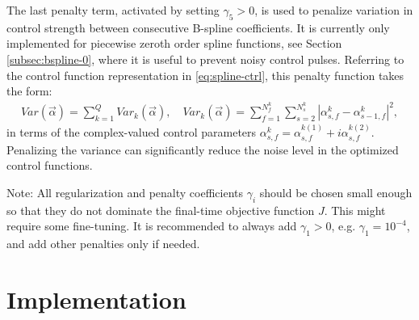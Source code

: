 \documentclass[11pt]{article}
\begin{document}
The last penalty term, activated by setting $\gamma_5>0$, is used to penalize variation in control strength between consecutive B-spline coefficients. It is currently only implemented for piecewise zeroth order spline functions, see Section \ref{subsec:bspline-0}, where it is useful to prevent noisy control pulses. Referring to the control function representation in \eqref{eq:spline-ctrl}, this penalty function takes the form:
\begin{align}
  Var(\vec{\alpha}) = \sum_{k=1}^Q Var_k(\vec{\alpha}),\quad Var_k(\vec{\alpha}) = \sum_{f=1}^{N_f^k} \sum_{s=2}^{N_s^k} |\alpha_{s,f}^k - \alpha_{s-1,f}^k|^2,
\end{align}
in terms of the complex-valued control parameters $\alpha_{s,f}^k = \alpha_{s,f}^{k(1)} + i \alpha_{s,f}^{k(2)}$. Penalizing the variance can significantly reduce the noise level in the optimized control functions.

Note: All regularization and penalty coefficients $\gamma_i$ should be chosen small enough so that they do not dominate the final-time objective function $J$. This might require some fine-tuning. It is recommended to always add $\gamma_1>0$, e.g. $\gamma_1 = 10^{-4}$, and add other penalties only if needed. 



\section{Implementation}
\end{document}
